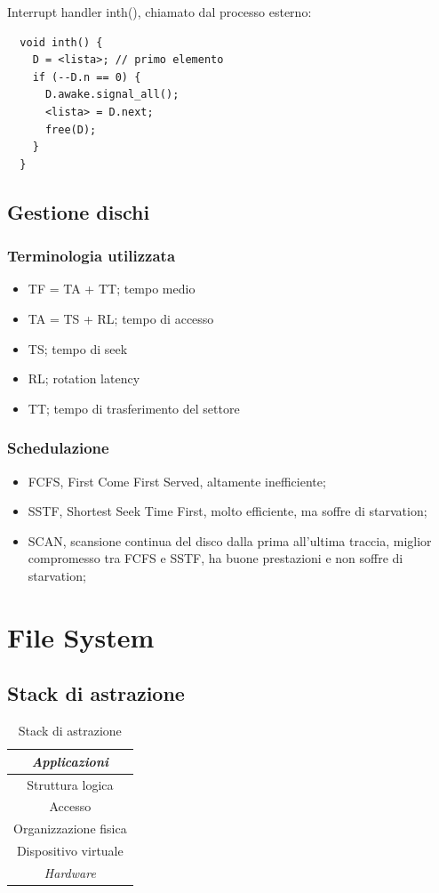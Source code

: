 \documentclass[12pt,a4paper]{article}
\begin{document}
Interrupt handler inth(), chiamato dal processo esterno:
\begin{verbatim}
  void inth() {
    D = <lista>; // primo elemento
    if (--D.n == 0) {
      D.awake.signal_all();
      <lista> = D.next;
      free(D);
    }
  }
\end{verbatim}

\subsection{Gestione dischi}
\subsubsection{Terminologia utilizzata}
\begin{itemize}
  \item TF = TA + TT; tempo medio
  \item TA = TS + RL; tempo di accesso
  \item TS; tempo di seek
  \item RL; rotation latency
  \item TT; tempo di trasferimento del settore
\end{itemize}

\subsubsection{Schedulazione}
\begin{itemize}
  \item FCFS, First Come First Served, altamente inefficiente;
  \item SSTF, Shortest Seek Time First, molto efficiente, ma soffre di
    starvation;
  \item SCAN, scansione continua del disco dalla prima all'ultima traccia,
    miglior compromesso tra FCFS e SSTF, ha buone prestazioni e non
    soffre di starvation;
\end{itemize}

\section{File System}
\subsection{Stack di astrazione}
\begin{table}[H]
  \centering
  \begin{tabular}{| c |}\hline
  \emph{Applicazioni} \\ \hline
  Struttura logica \\ \hline
  Accesso \\ \hline
  Organizzazione fisica \\ \hline
  Dispositivo virtuale \\ \hline
  \emph{Hardware} \\ \hline
  \end{tabular}
  \caption{Stack di astrazione}
\end{table}
\end{document}

